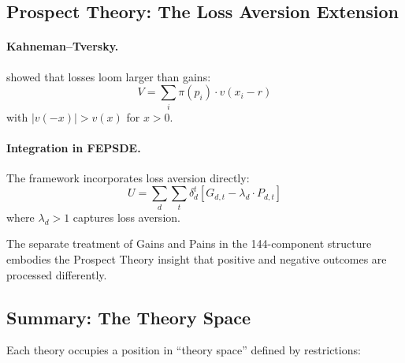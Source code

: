 \documentclass[12pt,a4paper]{article}
\begin{document}
\subsection{Prospect Theory: The Loss Aversion Extension}

\paragraph{Kahneman--Tversky.}
\citet{kahnemantversky1979} showed that losses loom larger than gains:
\begin{equation}
  V = \sum_i \pi(p_i) \cdot v(x_i - r)
\end{equation}
with $|v(-x)| > v(x)$ for $x > 0$.

\paragraph{Integration in FEPSDE.}
The framework incorporates loss aversion directly:
\begin{equation}
  U = \sum_d \sum_t \delta_d^t [G_{d,t} - \lambda_d \cdot P_{d,t}]
\end{equation}
where $\lambda_d > 1$ captures loss aversion.

The separate treatment of Gains and Pains in the 144-component structure
embodies the Prospect Theory insight that positive and negative outcomes
are processed differently.

\subsection{Summary: The Theory Space}

Each theory occupies a position in ``theory space'' defined by restrictions:
\end{document}
